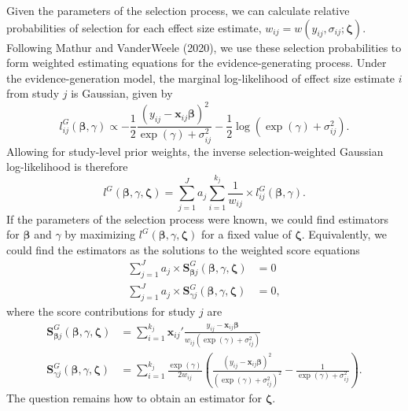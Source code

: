 \documentclass[
  man, donotrepeattitle,floatsintext]{apa7}
\begin{document}
Given the parameters of the selection process, we can calculate relative probabilities of selection for each effect size estimate, \(w_{ij} = w(y_{ij}, \sigma_{ij}; \boldsymbol\zeta)\). Following Mathur and VanderWeele (2020), we use these selection probabilities to form weighted estimating equations for the evidence-generating process. Under the evidence-generation model, the marginal log-likelihood of effect size estimate \(i\) from study \(j\) is Gaussian, given by
\[
l^G_{ij}(\boldsymbol\beta, \gamma) \propto - \frac{1}{2}\frac{(y_{ij} - \mathbf{x}_{ij} \boldsymbol\beta)^2}{\exp(\gamma) + \sigma_{ij}^2} - \frac{1}{2}\log(\exp(\gamma) + \sigma_{ij}^2).
\]
Allowing for study-level prior weights, the inverse selection-weighted Gaussian log-likelihood is therefore
\[
l^G(\boldsymbol\beta, \gamma, \boldsymbol\zeta) = \sum_{j=1}^J a_j \sum_{i=1}^{k_j} \frac{1}{w_{ij}} \times l^G_{ij}(\boldsymbol\beta, \gamma).
\]
If the parameters of the selection process were known, we could find estimators for \(\boldsymbol\beta\) and \(\gamma\) by maximizing \(l^G(\boldsymbol\beta, \gamma, \boldsymbol\zeta)\) for a fixed value of \(\boldsymbol\zeta\).
Equivalently, we could find the estimators as the solutions to the weighted score equations
\begin{align}
\sum_{j=1}^J a_j \times \mathbf{S}^G_{\boldsymbol\beta j} (\boldsymbol\beta, \gamma, \boldsymbol\zeta) &= 0 \label{eq:hybrid-score-beta} \\
\sum_{j=1}^J a_j \times \mathbf{S}^G_{\gamma j} (\boldsymbol\beta, \gamma, \boldsymbol\zeta) &= 0, \label{eq:hybrid-score-gamma}
\end{align}
where the score contributions for study \(j\) are
\begin{align}
\mathbf{S}^G_{\boldsymbol\beta j} (\boldsymbol\beta, \gamma, \boldsymbol\zeta) &= \sum_{i=1}^{k_j} \mathbf{x}_{ij}' \frac{y_{ij} - \mathbf{x}_{ij} \boldsymbol\beta}{w_{ij} \left(\exp(\gamma) + \sigma_{ij}^2\right)} \\
\mathbf{S}^G_{\gamma j} (\boldsymbol\beta, \gamma, \boldsymbol\zeta) &= \sum_{i=1}^{k_j} \frac{\exp(\gamma)}{2 w_{ij}} \left(\frac{(y_{ij} -\mathbf{x}_{ij} \boldsymbol\beta)^2}{\left(\exp(\gamma) + \sigma_{ij}^2\right)^2} - \frac{1}{\exp(\gamma) + \sigma_{ij}^2}\right).
\end{align}
The question remains how to obtain an estimator for \(\boldsymbol\zeta\).
\end{document}
